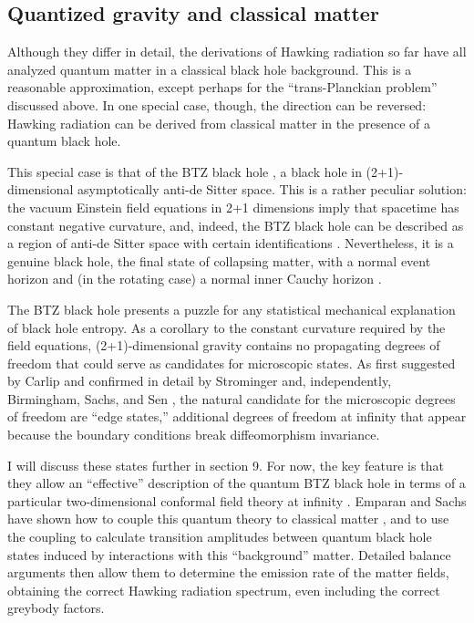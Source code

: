\documentclass[11pt]{article}
\begin{document}
\subsection{Quantized gravity and classical matter \label{BTZa}}

Although they differ in detail, the derivations of Hawking radiation 
so far have all analyzed quantum matter in a classical 
black hole background.  This is a reasonable approximation,
except perhaps for the ``trans-Planckian problem'' discussed
above.  In one special case, though, the direction can be reversed:
Hawking radiation can be derived from classical matter in the
presence of a quantum black hole.

This special case is that of the BTZ black hole \cite{BTZ}, a black
hole in (2+1)-dimensional asymptotically anti-de Sitter space.
This is a rather peculiar solution: the vacuum Einstein field equations
in 2+1 dimensions imply that spacetime has constant negative
curvature, and, indeed, the BTZ black hole can be described as a
region of anti-de Sitter space with certain identifications \cite{BHTZ}.
Nevertheless, it is a genuine black hole, the final state of collapsing
matter, with a normal event horizon and (in the rotating case) a
normal inner Cauchy horizon \cite{CarlipBTZ}.

The BTZ black hole presents a puzzle for any statistical mechanical
explanation of black hole entropy.  As a corollary to the constant curvature
required by the field equations, (2+1)-dimensional gravity contains 
no propagating degrees of freedom that could serve as candidates for
microscopic states.  As first suggested by Carlip \cite{Carlipedge} and
confirmed in detail by Strominger\cite{Strominger} and, independently,
Birmingham, Sachs, and Sen \cite{BSS}, the natural candidate for the
microscopic degrees of freedom are ``edge states,'' additional degrees
of freedom at infinity that appear because the boundary conditions
break diffeomorphism invariance.   

I will discuss these states  further in section 9.  For now, 
the key feature is that they allow an ``effective'' description of the 
quantum BTZ black hole in terms of a particular two-dimensional conformal
field theory at infinity \cite{CarlipBTZb}.   Emparan and Sachs have shown 
how to couple this quantum theory to classical matter \cite{ES}, and 
to use the coupling to calculate transition amplitudes between quantum 
black hole states induced by interactions with this ``background'' matter.  
Detailed balance arguments then allow them to determine the emission 
rate of the matter fields, obtaining the correct Hawking radiation spectrum, 
even including the correct greybody factors.
\end{document}
